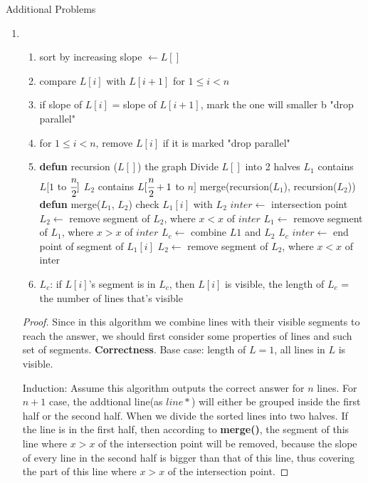 \documentclass[paper=a4, fontsize=11pt]{scrartcl} %
\makeatletter
\numberwithin{equation}{section} %
\numberwithin{figure}{section} %
\numberwithin{table}{section} %
\renewcommand{\section}{\@startsection{section}{1}{0mm}
  {-\baselineskip}{0.5 \baselineskip}{\bf\leftline}}
\newenvironment{myproof}{\begin{proof}\setlength{\parindent}{2em}}{\end{proof}}
\makeatother
\begin{document}
\section{Additional Problems}
\begin{enumerate}
\item %
\begin{enumerate}
\item sort by increasing slope $\leftarrow L[]$
\item compare $L[i]$ with $L[i+1]$ for $1\leq i < n$
\item if slope of $L[i]$ = slope of $L[i+1]$, mark the one will smaller b "drop parallel"
\item for $1\leq i < n$, remove $L[i]$ if it is marked "drop parallel"
\item 
\begin{algorithmic}
\STATE \textbf{defun} recursion ($L[]$)
	\RETURN the graph
\ENDIF
\STATE Divide $L[]$ into 2 halves
\STATE $L_1$ contains $L[1$ to $\cfrac{n}{2}]$
\STATE $L_2$ contains $L[\cfrac{n}{2} + 1$ to $n]$
\RETURN  merge(recursion($L_1$), recursion($L_2$))
\STATE
\STATE \textbf{defun} merge($L_1$, $L_2$)
	\STATE check $L_1[i]$ with $L_2$
		\STATE $inter \leftarrow$ intersection point
		\STATE $L_2 \leftarrow$ remove segment of $L_2$, where $x < x$ of $inter$ 
		\STATE $L_1\leftarrow$ remove segment of $L_1$, where $x > x$ of $inter$
		\STATE $L_c\leftarrow$ combine $L1$ and $L_2$
		\RETURN $L_c$
	\ELSE
		\STATE $inter \leftarrow$ end point of segment of $L_1[i]$
		\STATE $L_2\leftarrow$ remove segment of $L_2$, where $x < x$ of inter
	\ENDIF
\ENDFOR
\end{algorithmic}
\item $L_c$: if $L[i]$'s segment is in $L_c$, then $L[i]$ is visible, the length of $L_c$ = the number of lines that's visible
\end{enumerate}
\begin{myproof}
Since in this algorithm we combine lines with their visible segments to reach the answer, we should first consider some properties of lines and such set of segments.
\textbf{Correctness}.
 Base case: length of $L = 1$, all lines in $L$ is visible.

Induction: Assume this algorithm outputs the correct answer for $n$ lines. For $n+1$ case, the addtional line(as $line*$) will either be grouped inside the first half or the second half. When we divide the sorted lines into two halves. If the line is in the first half, then according to \textbf{merge()}, the segment of this line where $x > x$ of the intersection point will be removed, because the slope of every line in the second half is bigger than that of this line, thus covering the part of this line where $x > x$ of the intersection point.


\end{myproof}
\end{enumerate}
\end{document}
